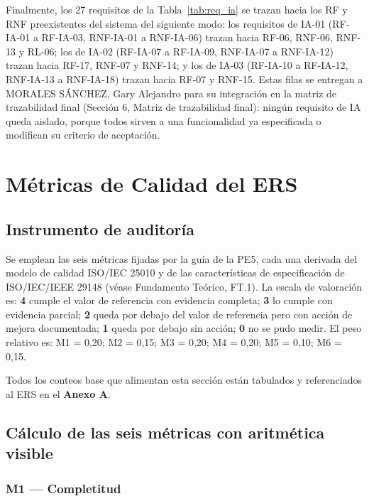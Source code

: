 \documentclass[journal,onecolumn]{IEEEtran}
\begin{document}
Finalmente, los 27 requisitos de la Tabla~\ref{tab:req_ia} se trazan hacia los RF y RNF
preexistentes del sistema del siguiente modo: los requisitos de IA-01 (RF-IA-01 a RF-IA-03,
RNF-IA-01 a RNF-IA-06) trazan hacia RF-06, RNF-06, RNF-13 y RL-06; los de IA-02 (RF-IA-07 a
RF-IA-09, RNF-IA-07 a RNF-IA-12) trazan hacia RF-17, RNF-07 y RNF-14; y los de IA-03 (RF-IA-10 a
RF-IA-12, RNF-IA-13 a RNF-IA-18) trazan hacia RF-07 y RNF-15. Estas filas se entregan a
MORALES SÁNCHEZ, Gary Alejandro para su integración en la matriz de trazabilidad final
(Sección 6, Matriz de trazabilidad final): ningún requisito de IA queda aislado, porque todos sirven a
una funcionalidad ya especificada o modifican su criterio de aceptación.
	\newpage
	
	\section{Métricas de Calidad del ERS}
\label{sec:metricas}

\subsection{Instrumento de auditoría}

Se emplean las seis métricas fijadas por la guía de la PE5, cada una derivada del modelo de calidad ISO/IEC 25010 y de las características de especificación de ISO/IEC/IEEE 29148 (véase Fundamento Teórico, FT.1). La escala de valoración es: \textbf{4} cumple el valor de referencia con evidencia completa; \textbf{3} lo cumple con evidencia parcial; \textbf{2} queda por debajo del valor de referencia pero con acción de mejora documentada; \textbf{1} queda por debajo sin acción; \textbf{0} no se pudo medir. El peso relativo es: M1 = 0,20; M2 = 0,15; M3 = 0,20; M4 = 0,20; M5 = 0,10; M6 = 0,15.

Todos los conteos base que alimentan esta sección están tabulados y referenciados al ERS en el \textbf{Anexo A}.

\subsection{Cálculo de las seis métricas con aritmética visible}

\subsubsection*{M1 --- Completitud}
\end{document}
